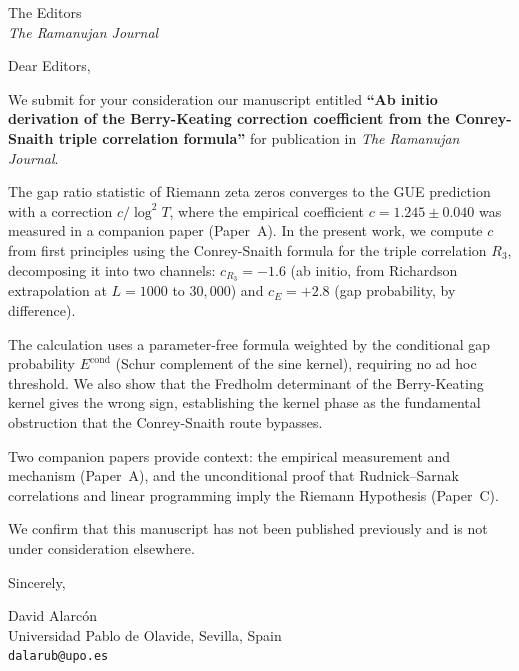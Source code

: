 \documentclass[11pt]{letter}
\begin{document}
\begin{letter}{The Editors \\ \textit{The Ramanujan Journal}}

\opening{Dear Editors,}

We submit for your consideration our manuscript entitled
\textbf{``Ab initio derivation of the Berry-Keating correction coefficient
from the Conrey-Snaith triple correlation formula''}
for publication in \textit{The Ramanujan Journal}.

The gap ratio statistic of Riemann zeta zeros converges to the GUE
prediction with a correction $c/\log^2 T$, where the empirical
coefficient $c = 1.245 \pm 0.040$ was measured in a companion
paper (Paper~A). In the present work, we compute $c$ from first
principles using the Conrey-Snaith formula for the triple correlation
$R_3$, decomposing it into two channels: $c_{R_3} = -1.6$ (ab initio,
from Richardson extrapolation at $L = 1000$ to $30{,}000$) and
$c_E = +2.8$ (gap probability, by difference).

The calculation uses a parameter-free formula weighted by the
conditional gap probability $E^{\mathrm{cond}}$ (Schur complement
of the sine kernel), requiring no ad hoc threshold. We also show
that the Fredholm determinant of the Berry-Keating kernel gives the
wrong sign, establishing the kernel phase as the fundamental
obstruction that the Conrey-Snaith route bypasses.

Two companion papers provide context: the empirical measurement and
mechanism (Paper~A), and the unconditional proof that Rudnick--Sarnak
correlations and linear programming imply the Riemann Hypothesis
(Paper~C).

We confirm that this manuscript has not been published previously and is
not under consideration elsewhere.

\closing{Sincerely,}

David Alarc\'on\\
Universidad Pablo de Olavide, Sevilla, Spain\\
\texttt{dalarub@upo.es}

\end{letter}
\end{document}
